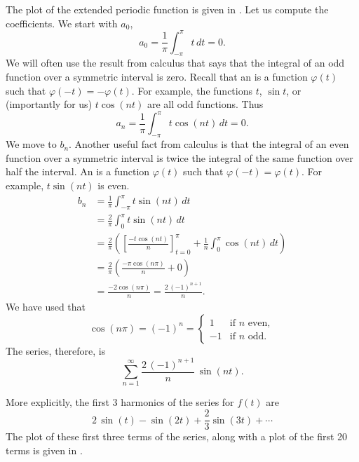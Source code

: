 \begin{example}
The plot of the extended periodic function is given in
.
Let us compute the coefficients.  We start with $a_0$,
\begin{equation*}
a_0 = \frac{1}{\pi} \int_{-\pi}^\pi t \,dt = 0 .
\end{equation*}
We will often use the result from calculus that says that the integral of an odd
function over a symmetric interval is zero.  Recall that an
\emph{} is a
function $\varphi(t)$ such that $\varphi(-t) = -\varphi(t)$.
For example,
the functions $t$, $\sin t$, or (importantly for us)
$t \cos (nt)$ are all odd functions.  Thus
\begin{equation*}
a_n = \frac{1}{\pi} \int_{-\pi}^\pi t \cos (nt) \,dt = 0 .
\end{equation*}
We move to $b_n$.  Another useful fact from calculus
is that the integral of an even function over
a symmetric interval is
twice the integral of the same function over half the interval.  
An \emph{}
is a
function $\varphi(t)$ such that $\varphi(-t) = \varphi(t)$.  For example,
$t \sin (nt)$ is even.
\begin{equation*}
\begin{split}
b_n & = \frac{1}{\pi} \int_{-\pi}^\pi t \sin (nt) \,dt \\
& = \frac{2}{\pi} \int_{0}^\pi t \sin (nt) \,dt \\
& = \frac{2}{\pi} \left(
\left[ \frac{-t \cos (nt)}{n} \right]_{t=0}^{\pi}
+
\frac{1}{n}
\int_{0}^\pi \cos (nt) \,dt
\right)
\\
& = \frac{2}{\pi} \left(
\frac{-\pi \cos (n\pi)}{n}
+
0
\right) \\
& =  \frac{-2 \cos (n\pi)}{n}
=  \frac{2 \,{(-1)}^{n+1}}{n} .
\end{split}
\end{equation*}
We have used that 
\begin{equation*}
\cos (n\pi) = {(-1)}^n =
\begin{cases}
1 & \text{if } n \text{ even} , \\
-1 & \text{if } n \text{ odd} .
\end{cases}
\end{equation*}
The series, therefore, is
\begin{equation*}
\sum_{n=1}^\infty
\frac{2 \,{(-1)}^{n+1}}{n} \,
\sin (n t) .
\end{equation*}

More explicitly,
the first 3 harmonics of the series for $f(t)$ are
\begin{equation*}
2 \, \sin (t)
- \sin (2t)
+\frac{2}{3} \sin (3t)
+ \cdots
\end{equation*}
The plot of these first three terms of the series, along with a plot
of the first 20 terms is given in
.


\end{example}
